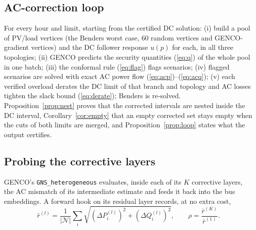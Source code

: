 \subsection{AC-correction loop}
For every hour and limit, starting from the certified DC solution: (i) build a pool of
PV/load vertices (the Benders worst case, 60 random vertices and GENCO-gradient
vertices) and the DC follower response $u(p)$ for each, in all three topologies;
(ii) GENCO predicts the security quantities (\ref{eq:q}) of the whole pool in one batch;
(iii) the conformal rule (\ref{eq:flag}) flags scenarios; (iv) flagged scenarios are solved
with exact AC power flow (\ref{eq:acp})--(\ref{eq:acq}); (v) each verified overload derates
the DC limit of that branch and topology and AC losses tighten the slack bound
(\ref{eq:derate}); Benders is re-solved. Proposition~\ref{prop:nest} proves that the
corrected intervals are nested inside the DC interval, Corollary~\ref{cor:empty} that an
empty corrected set stays empty when the cuts of both limits are merged, and
Proposition~\ref{prop:loop} states what the output certifies.

\subsection{Probing the corrective layers}
GENCO's \texttt{GNS\_heterogeneous} evaluates, inside each of its $K$ corrective layers,
the AC mismatch of its intermediate estimate and feeds it back into the bus embeddings.
A forward hook on its residual layer records, at no extra cost,
\begin{equation}
\bar r^{(l)}=\frac1{|\mathcal N|}\sum_i\sqrt{(\Delta P^{(l)}_i)^2+(\Delta Q^{(l)}_i)^2},\qquad
\rho=\frac{\bar r^{(K)}}{\bar r^{(1)}} .
\label{eq:traj-short}
\end{equation}

